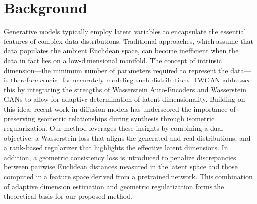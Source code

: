 \documentclass{article} %
\begin{document}
\section{Background}
\label{sec:background}
Generative models typically employ latent variables to encapsulate the essential features of complex data distributions. Traditional approaches, which assume that data populates the ambient Euclidean space, can become inefficient when the data in fact lies on a low-dimensional manifold. The concept of intrinsic dimension---the minimum number of parameters required to represent the data---is therefore crucial for accurately modeling such distributions. LWGAN addressed this by integrating the strengths of Wasserstein Auto-Encoders and Wasserstein GANs to allow for adaptive determination of latent dimensionality. Building on this idea, recent work in diffusion models has underscored the importance of preserving geometric relationships during synthesis through isometric regularization. Our method leverages these insights by combining a dual objective: a Wasserstein loss that aligns the generated and real distributions, and a rank-based regularizer that highlights the effective latent dimensions. In addition, a geometric consistency loss is introduced to penalize discrepancies between pairwise Euclidean distances measured in the latent space and those computed in a feature space derived from a pretrained network. This combination of adaptive dimension estimation and geometric regularization forms the theoretical basis for our proposed method.
\end{document}
